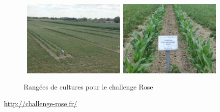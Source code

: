 \begin {figure}[!h]
\begin{center}

    \hbox{ 
    \includegraphics[width=5cm]{images/imageRang1.jpg}
    \hspace*{1cm}  %
    \includegraphics[width=5cm]{images/imageRang2.jpg}
  }
\caption{Rangées de cultures pour le challenge Rose}
\label{Rangées de cultures pour le challenge Rose}
\end{center}
\end {figure}

\url{http://challenge-rose.fr/}


